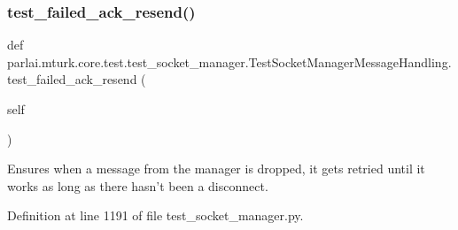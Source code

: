 \subsubsection{\texorpdfstring{test\+\_\+failed\+\_\+ack\+\_\+resend()}{test\_failed\_ack\_resend()}}
{\footnotesize\ttfamily def parlai.\+mturk.\+core.\+test.\+test\+\_\+socket\+\_\+manager.\+Test\+Socket\+Manager\+Message\+Handling.\+test\+\_\+failed\+\_\+ack\+\_\+resend (\begin{DoxyParamCaption}\item[{}]{self }\end{DoxyParamCaption})}

\begin{DoxyVerb}Ensures when a message from the manager is dropped, it gets retried until it
works as long as there hasn't been a disconnect.
\end{DoxyVerb}
 

Definition at line 1191 of file test\+\_\+socket\+\_\+manager.\+py.


